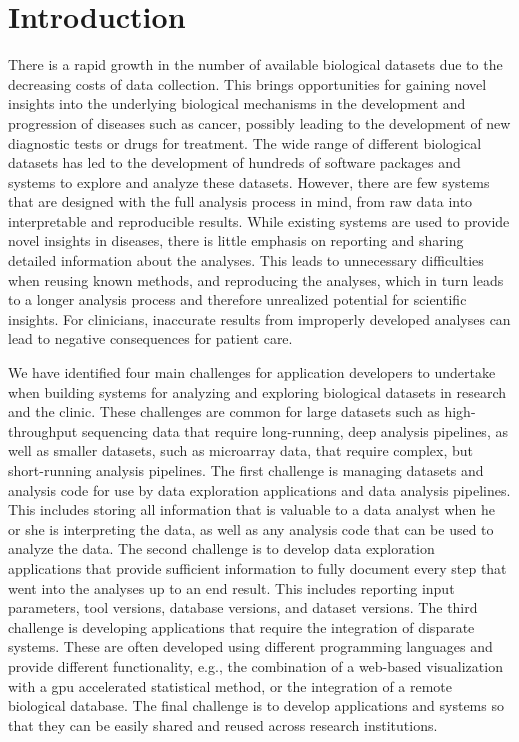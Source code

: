 \chapter{Introduction}
There is a rapid growth in the number of available biological datasets due to
the decreasing costs of data collection. This brings opportunities for gaining
novel insights into the underlying biological mechanisms in the development and
progression of diseases such as cancer, possibly leading to the development of
new diagnostic tests or drugs for treatment. The wide range of different
biological datasets has led to the development of hundreds of software packages
and systems to explore and analyze these datasets. However, there are few
systems that are designed with the full analysis process in mind, from raw data
into interpretable and reproducible results.  While existing systems are used to
provide novel insights in diseases, there is little emphasis on reporting and
sharing detailed information about the analyses. This leads to unnecessary
difficulties when reusing known methods, and reproducing the analyses, which in
turn leads to a longer analysis process and therefore unrealized potential for
scientific insights. For clinicians, inaccurate results from improperly
developed analyses can lead to negative consequences for patient
care.\cite{roy2017standards}

We have identified four main challenges for application developers to undertake
when building systems for analyzing and exploring biological datasets in
research and the clinic. These challenges are common for large datasets such as
high-throughput sequencing data that require long-running, deep analysis
pipelines, as well as smaller datasets, such as microarray data, that require
complex, but short-running analysis pipelines. The first challenge is managing
datasets and analysis code for use by data exploration applications and data
analysis pipelines. This includes storing all information that is valuable to a
data analyst when he or she is interpreting the data, as well as any analysis
code that can be used to analyze the data. The second challenge is to develop
data exploration applications that provide sufficient information to fully
document every step that went into the analyses up to an end result. This
includes reporting input parameters, tool versions, database versions, and
dataset versions. The third challenge is developing applications that require
the integration of disparate systems. These are often developed using different
programming languages and provide different functionality, e.g., the combination
of a web-based visualization with a \gls{gpu} accelerated statistical method,
or the integration of a remote biological database.
The final challenge is to develop applications and systems so that they can be
easily shared and reused across research institutions. 

